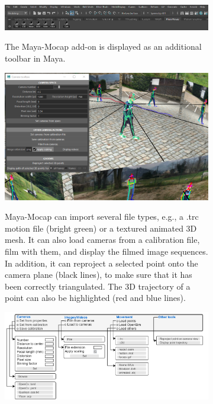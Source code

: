 \begin{figure}[hbtp!]
	\centering
	\begin{subfigure}[b]{1\textwidth}
		\centering
		\def\svgwidth{\columnwidth}
		\fontsize{10pt}{10pt}\selectfont
		\href{https://github.com/davidpagnon/Maya-Mocap}{
                  \includegraphics[width=\linewidth]{"../Chap3/Figures/Fig_MayaMocap1.png"}
            }
            \caption{The Maya-Mocap add-on is displayed as an additional toolbar in Maya.}
      \end{subfigure}
	\qquad
	\begin{subfigure}[b]{1\textwidth}
		\centering
		\def\svgwidth{\columnwidth}
		\fontsize{10pt}{10pt}\selectfont
		\href{https://github.com/davidpagnon/Maya-Mocap}{
                  \includegraphics[width=\linewidth]{"../Chap3/Figures/Fig_MayaMocap2.png"}
            }
            \caption{Maya-Mocap can import several file types, e.g., a .trc motion file (bright green) or a textured animated 3D mesh. It can also load cameras from a calibration file, film with them, and display the filmed image sequences. In addition, it can reproject a selected point onto the camera plane (black lines), to make sure that it has been correctly triangulated. The 3D trajectory of a point can also be highlighted (red and blue lines).}
      \end{subfigure}
      \begin{subfigure}[b]{1\textwidth}
		\centering
		\def\svgwidth{\columnwidth}
		\fontsize{10pt}{10pt}\selectfont
            \includegraphics[width=\linewidth]{"../Chap3/Figures/Fig_MayaMocap3.png"}

\end{subfigure}
\end{figure}
